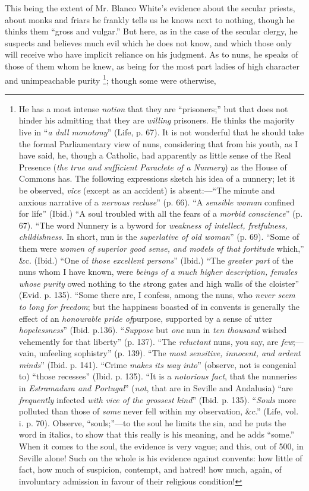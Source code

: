This being the extent of Mr. Blanco White's evidence
about the secular priests, about monks and friars he
frankly tells us he knows next to nothing, though he
thinks them ``gross and vulgar.'' But here, as in
the case of the secular clergy, he suspects and believes
much evil which he does not know, and which those only
will receive who have implicit reliance on his judgment.
As to nuns, he speaks of those of them whom he knew, as
being for the most part ladies of high character and
unimpeachable purity \footnote{He has a most intense \emph{notion}
that they are ``prisoners;'' but that does not
hinder his admitting that they are \emph{willing}
prisoners. He thinks the majority live in ``\emph{a
dull monotony}'' (Life, p. 67). It is not
wonderful that he should take the formal Parliamentary
view of nuns, considering that from his youth, as I have
said, he, though a Catholic, had apparently as little
sense of the Real Presence (\emph{the true and sufficient
Paraclete of a Nunnery}) as the House of Commons has.
The following expressions sketch his idea of a nunnery;
let it be observed, \emph{vice} (except as an accident)
is absent:—``The minute and anxious narrative of
a \emph{nervous recluse}'' (p. 66). ``A \emph{sensible
woman} confined for life'' (Ibid.) ``A soul
troubled with all the fears of a \emph{morbid conscience}''
(p. 67). ``The word Nunnery is a byword for \emph{weakness
of intellect, fretfulness, childishness}. In short,
nun is the \emph{superlative of old woman}'' (p.
69). ``Some of them were \emph{women of superior good
sense, and models of that fortitude} which,''
\&c. (Ibid.) ``One of \emph{those excellent persons}''
(Ibid.) ``The \emph{greater part} of the nuns whom
I have known, were \emph{beings of a much higher
description, females whose purity} owed nothing to
the strong gates and high walls of the cloister''
(Evid. p. 135). ``Some there are, I confess, among
the nuns, who \emph{never seem to long for freedom};
but the happiness boasted of in convents is generally the
effect of an \emph{honourable pride of}purpose,
supported by a sense of utter \emph{hopelessness}''
(Ibid. p.136). ``\emph{Suppose} but \emph{one}
nun in \emph{ten thousand} wished vehemently for that
liberty'' (p. 137). ``The \emph{reluctant}
nuns, you say, are \emph{few};—vain, unfeeling
sophistry'' (p. 139). ``The \emph{most sensitive,
innocent, and ardent minds}'' (Ibid. p. 141).
``Crime \emph{makes its way into}'' (observe,
not is congenial to) ``those recesses'' (Ibid. p.
135). ``It is a \emph{notorious fact}, that the
nunneries in \emph{Estramadura and Portugal}'' (\emph{not},
that are in Seville and Andalusia) ``are \emph{frequently}
infected \emph{with vice of the grossest kind}''
(Ibid. p. 135). ``\emph{Souls} more polluted than
those of \emph{some} never fell within my observation,
\&c.'' (Life, vol. i. p. 70). Observe,
``souls;''—to the soul he limits the sin,
and he puts the word in italics, to show that this really
is his meaning, and he adds ``some.'' When it
comes to the soul, the evidence is very vague; and this,
out of 500, in Seville alone! Such on the whole is his
evidence against convents: how little of fact, how much
of suspicion, contempt, and hatred! how much, again, of
involuntary admission in favour of their religious
condition!}; though some were otherwise,

